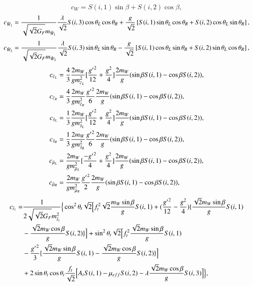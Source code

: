\documentclass[final,3p,times,pdflatex]{elsarticle}
\begin{document}
\begin{equation}
c_{W} = S(i,1)\sin\beta + S(i,2)\cos\beta,
\end{equation}
\begin{equation}
c_{\tilde{W}_1} = {1 \over \sqrt{\sqrt{2} G_{F}} m_{\tilde{W}_1}}{\lambda \over \sqrt{2}}S(i,3)\cos\theta_L \cos\theta_R + {g \over \sqrt{2}}\left[S(i,1)\sin\theta_L \cos\theta_R + S(i,2) \cos\theta_L \sin\theta_R\right],
\end{equation}
\begin{equation}
c_{\tilde{W}_2} = {1 \over \sqrt{\sqrt{2} G_{F}} m_{\tilde{W}_2}}{\lambda \over \sqrt{2}}S(i,3)\sin\theta_L \sin\theta_R - {g \over \sqrt{2}}\left[S(i,1)\cos\theta_L \sin\theta_R + S(i,2) \sin\theta_L \cos\theta_R\right],
\end{equation}
\begin{align}
c_{\tilde{c}_L} &= {4 \over 3} {2 m_{W} \over g m_{\tilde{c}_L}^2} [{{g'}^2 \over 12} + {g^2 \over 4}]{2 m_{W} \over g}(\sin\beta S(i,1) - \cos\beta S(i,2)),  \\
c_{\tilde{c}_R} &= {4 \over 3} {2 m_{W} \over g m_{\tilde{c}_R}^2} {{g'}^2 \over 6}{2 m_{W} \over g}(\sin\beta S(i,1) - \cos\beta S(i,2)), \\
c_{\tilde{s}_L} &= {1 \over 3} {2 m_{W} \over g m_{\tilde{s}_L}^2} [{{g'}^2 \over 12} + {g^2 \over 4}]{2 m_{W} \over g}(\sin\beta S(i,1) - \cos\beta S(i,2)),  \\
c_{\tilde{s}_R} &= {1 \over 3} {2 m_{W} \over g m_{\tilde{s}_R}^2} {{g'}^2 \over 6}{2 m_{W} \over g}(\sin\beta S(i,1) - \cos\beta S(i,2)), \\
c_{\tilde{\mu}_L} &= {2 m_{W} \over g m_{\tilde{\mu}_L}^2} [{-{g'}^2 \over 4} + {g^2 \over 4}]{2 m_{W} \over g}(\sin\beta S(i,1) - \cos\beta S(i,2)),  \\
c_{\tilde{\mu}_R} &= {2 m_{W} \over g m_{\tilde{\mu}_R}^2} {{g'}^2 \over 2}{2 m_{W} \over g}(\sin\beta S(i,1) - \cos\beta S(i,2)),
\end{align}
\begin{equation}
\begin{aligned}
c_{\tilde{t}_1} = & {1 \over 2\sqrt{\sqrt{2}G_{F}} m_{\tilde{t}_1}^2}\Big\{\cos^2 \theta_t \sqrt{2}\Big[f_{t}^2 \sqrt{2} {m_{W} \sin\beta \over g} S(i,1) + ({{g'}^2 \over 12} - {g^2 \over 4}) \{{\sqrt{2} m_{W} \sin\beta \over g} S(i,1)  \\ & -{\sqrt{2} m_{W} \cos\beta \over g}S(i,2)\}\Big] + \sin^2 \theta_t \sqrt{2} \Big[ f_{t}^2 {\sqrt{2} m_{W} \sin\beta \over g}S(i,1) \\ & - {{g'}^2 \over 3}\{{\sqrt{2} m_{W} \sin\beta \over g}S(i,1) - {\sqrt{2} m_{W} \cos\beta \over g} S(i,2)\}\Big] \\ & + 2\sin\theta_t \cos\theta_t {f_{t} \over \sqrt{2}}\Big[A_{t}S(i,1) - \mu_{eff}S(i,2) - \lambda {\sqrt{2} m_{W} \cos\beta \over g}S(i,3)\Big]\Big\},
\end{aligned}
\end{equation}
\end{document}
